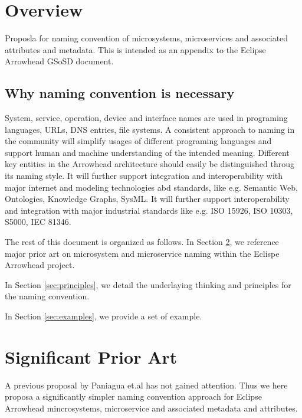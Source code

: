 \documentclass[a4paper]{arrowhead}
\begin{document}
\tableofcontents
\newpage

\section{Overview}
\label{sec:overview}
  Proposla for naming convention of microsystems, microservices and
    associated attributes and metadata. This is intended as an
    appendix to the Eclipse Arrowhead GSoSD document.

\subsection{Why naming convention is necessary}
System, service, operation, device and interface names are used in
programing languages, URLs, DNS entries, file systems. A consistent
approach to naming in the community will simplify usages of different programing
languages and support human and machine understanding of the intended
meaning. Different key entities in the Arrowhead architecture should
easily be distinguished throug its naming style.  
It will further support integration and interoperability with
major internet and modeling technologies abd standards, like
e.g. Semantic Web, Ontologies, Knowledge Graphs, SysML. It will further support interoperability and
integration with major industrial standards like e.g. ISO 15926, ISO
10303, S5000, IEC 81346. 
    
The rest of this document is organized as follows.
In Section \ref{sec:prior_art}, we reference major prior art on
microsystem and microservice naming within the Eclispe Arrowhead project. 

In Section \ref{sec:principles}, we detail the underlaying thinking
and principles for the
naming convention.

In Section \ref{sec:examples}, we provide a set of example.


\newpage

\section{Significant Prior Art}
\label{sec:prior_art}

A previous proposal by Paniagua et.al \cite{Paniagua_2019} has not
  gained attention. Thus we here proposa a significantly simpler
  naming convention approach for Eclipse Arrowhead mincrosystems,
  microservice and associated metadata and attributes.
\end{document}
